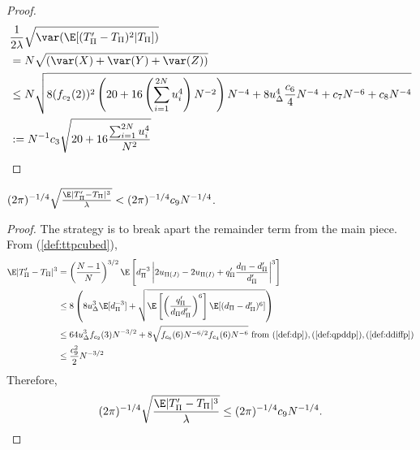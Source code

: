 \begin{proof}
  \begin{align*}
    &\frac{1}{2\lambda} \sqrt{\var (\E [(T_{\Pi}'-T_{\Pi})^2|T_{\Pi}])} \\
    &= N \sqrt{(\var(X) + \var(Y) + \var(Z))} \\
    &\leq N \sqrt{
      8(f_{c_2}(2))^2 \left ( 20 + 16 \left ( \sum_{i=1}^{2N} u_{i}^4 \right )N^{-2} \right ) N^{-4}
      + 8u_{\Delta}^4 \frac{c_6}{4} N^{-4}
      + c_7 N^{-6} + c_8 N^{-4}} \\
    &:= N^{-1} c_3\sqrt{20 + 16\frac{\sum_{i=1}^{2N} u_{i}^4}{N^2}} \\
  \end{align*}
\end{proof}

\begin{proposition}
  \label{P:P3}
  $(2\pi)^{-1/4}\sqrt{\frac{\E|T_{\Pi}'-T_{\Pi}|^3}{\lambda}}
  < (2\pi)^{-1/4} c_9 N^{-1/4}$.
\end{proposition}
\begin{proof}
  The strategy is to break apart the remainder term from the main piece.  From (\ref{def:ttpcubed}),
  \begin{align*}
    \E|T_{\Pi}'-T_{\Pi}|^3
    &= \left (\frac{N-1}{N}\right )^{3/2}
    \E \left [d_{\Pi}^{-3} \left |2u_{\Pi(J)}-2u_{\Pi(I)}+q_{\Pi}'\frac{d_{\Pi}-d_{\Pi}'}{d_{\Pi}'} \right |^3
    \right ] \\
    &\leq 8 \left (
      8 u_{\Delta}^3 \E [d_{\Pi}^{-3}] +
      \sqrt{\E \left [ \left ( \frac{q_{\Pi}'}{d_{\Pi}d_{\Pi}'} \right )^6 \right ]  \E
        [(d_{\Pi}-d_{\Pi}')^6]} \right ) \\
    &\leq 64 u_{\Delta}^3 f_{c_2}(3) N^{-3/2} +
    8 \sqrt{f_{c_6}(6) N^{-6/2} f_{c_4}(6) N^{-6}} \text{ from }
    (\ref{def:dp}),(\ref{def:qpddp}),(\ref{def:ddiffp}) \\
    &\leq \frac{c_9^2}{2} N^{-3/2}
  \end{align*}
  Therefore,
  \begin{equation*}
    (2\pi)^{-1/4}\sqrt{\frac{\E|T_{\Pi}'-T_{\Pi}|^3}{\lambda}} \leq
    (2\pi)^{-1/4} c_9 N^{-1/4}.
  \end{equation*}
\end{proof}


